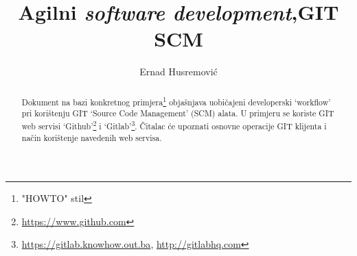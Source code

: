 \documentclass[times, utf8, seminar]{fit}
\begin{document}






\title{Agilni \emph{software development},\newline GIT SCM}

\author{Ernad Husremović}


\maketitle

\tableofcontents

\newpage

\begin{abstract}

Dokument na bazi konkretnog primjera\footnote{"HOWTO" stil} objašnjava uobičajeni developerski `workflow' pri korištenju GIT `Source Code Management' (SCM) alata. 
U primjeru se koriste GIT web servisi `Github'\footnote{\url{https://www.github.com}} i `Gitlab'\footnote{\url{https://gitlab.knowhow.out.ba}, \url{http://gitlabhq.com}}.
Čitalac će upoznati osnovne operacije GIT klijenta i način korištenje navedenih web servisa.


\end{abstract}
\end{document}
